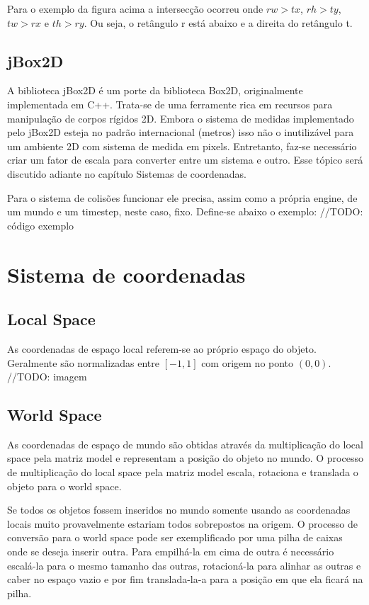 \documentclass[12pt, 
openright, 
oneside, 
a4paper,    
brazil]{facom-ufu-abntex2}
\begin{document}
Para o exemplo da figura acima a intersecção ocorreu onde $rw > tx$, $rh > ty$, $tw > rx$ e $th > ry$. Ou seja, o retângulo r está abaixo e a direita do retângulo t.

\subsection{jBox2D}

A biblioteca jBox2D é um porte da biblioteca Box2D, originalmente implementada em C++. Trata-se de uma ferramente rica em recursos para manipulação de corpos rígidos 2D. Embora o sistema de medidas implementado pelo jBox2D esteja no padrão internacional (metros) isso não o inutilizável para um ambiente 2D com sistema de medida em pixels. Entretanto, faz-se necessário criar um fator de escala para converter entre um sistema e outro. Esse tópico será discutido adiante no capítulo Sistemas de coordenadas.

Para o sistema de colisões funcionar ele precisa, assim como a própria engine, de um mundo e um timestep, neste caso, fixo. Define-se abaixo o exemplo:
//TODO: código exemplo

\section{Sistema de coordenadas}

\subsection{Local Space}
As coordenadas de espaço local referem-se ao próprio espaço do objeto. Geralmente são normalizadas entre $[-1, 1]$ com origem no ponto $(0,0)$.
//TODO: imagem
\subsection{World Space}
As coordenadas de espaço de mundo são obtidas através da multiplicação do local space pela matriz model e representam a posição do objeto no mundo. O processo de multiplicação do local space pela matriz model  escala, rotaciona e translada o objeto para o world space.

Se todos os objetos fossem inseridos no mundo somente usando as coordenadas locais muito provavelmente estariam todos sobrepostos na origem. O processo de conversão para o world space pode ser exemplificado por uma pilha de caixas onde se deseja inserir outra. Para empilhá-la em cima de outra é necessário escalá-la para o mesmo tamanho das outras, rotacioná-la para alinhar as outras e caber no espaço vazio e por fim translada-la-a para a posição em que ela ficará na pilha.
\end{document}
